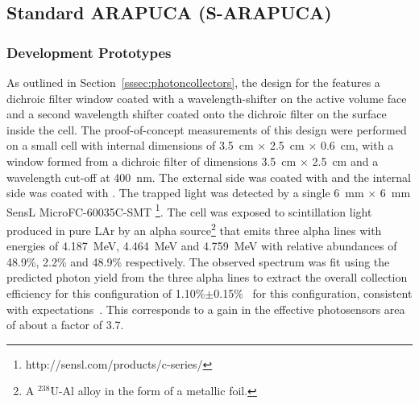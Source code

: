 \subsection{Standard ARAPUCA (S-ARAPUCA)}
\label{sec:sarapuca-prototypes}


\subsubsection{Development Prototypes}
\label{sec:valid-initial}

As outlined in Section~\ref{sssec:photoncollectors}, the design for the  features a dichroic filter window coated with a wavelength-shifter on the \lar active volume face and a second wavelength shifter coated onto the dichroic filter on the surface inside the cell.  
The proof-of-concept measurements of this design were performed on a small cell with internal dimensions of \SI{3.5}{cm} $\times$ \SI{2.5}{cm} $\times$ \SI{0.6}{cm}, with a window formed from a dichroic filter of  dimensions \SI{3.5}{cm} $\times$ \SI{2.5}{cm} and a wavelength cut-off at \SI{400}{nm}. The external side was coated with  and the internal side was coated with . 
The trapped light was detected by a single \SI{6}{mm} $\times$ \SI{6}{mm} SensL MicroFC-60035C-SMT \footnote{http://sensl.com/products/c-series/}. The cell was exposed to scintillation light produced in pure LAr by an alpha source\footnote{A $^{238}$U-Al alloy in the form of a metallic foil.} that emits three alpha lines with energies of  \SI{4.187}{MeV}, \SI{4.464}{MeV} and \SI{4.759}{MeV} with relative abundances of 48.9\%, 2.2\% and 48.9\% respectively. 
The observed spectrum was fit using the predicted photon yield from the three alpha lines to extract the overall collection efficiency for this configuration of 1.10\%$\pm$0.15\%~\cite{Segreto:2018jdx} for this configuration, consistent with  expectations~\cite{Marinho:2018doi}. This corresponds to a gain in the effective photosensors area of about a factor of 3.7. 

